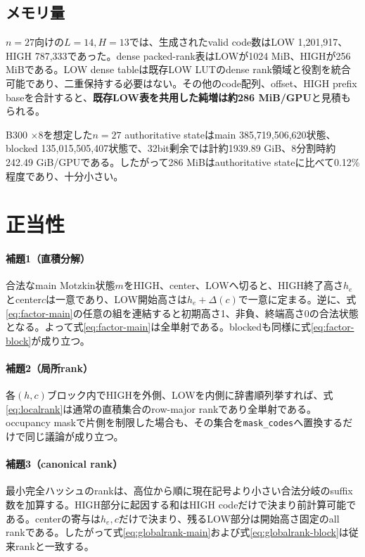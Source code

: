\documentclass[a4paper,10pt,twocolumn]{ltjsarticle}
\newcommand{\code}[1]{\texttt{#1}}
\begin{document}
\subsection{メモリ量}
$n=27$向けの$L=14,H=13$では、生成されたvalid code数はLOW 1,201,917、HIGH 787,333であった。dense packed-rank表はLOWが1024 MiB、HIGHが256 MiBである。LOW dense tableは既存LOW LUTのdense rank領域と役割を統合可能であり、二重保持する必要はない。その他のcode配列、offset、HIGH prefix baseを合計すると、\textbf{既存LOW表を共用した純増は約286 MiB/GPU}と見積もられる。

B300 $\times8$を想定した$n=27$ authoritative stateはmain 385,719,506,620状態、blocked 135,015,505,407状態で、32bit剰余では計約1939.89 GiB、8分割時約242.49 GiB/GPUである。したがって286 MiBはauthoritative stateに比べて0.12\%程度であり、十分小さい。

\section{正当性}
\paragraph{補題1（直積分解）}
合法なmain Motzkin状態$m$をHIGH、center、LOWへ切ると、HIGH終了高さ$h_e$とcenter$c$は一意であり、LOW開始高さは$h_e+\Delta(c)$で一意に定まる。逆に、式\eqref{eq:factor-main}の任意の組を連結すると初期高さ1、非負、終端高さ0の合法状態となる。よって式\eqref{eq:factor-main}は全単射である。blockedも同様に式\eqref{eq:factor-block}が成り立つ。

\paragraph{補題2（局所rank）}
各$(h,c)$ブロック内でHIGHを外側、LOWを内側に辞書順列挙すれば、式\eqref{eq:localrank}は通常の直積集合のrow-major rankであり全単射である。occupancy maskで片側を制限した場合も、その集合を\code{mask\_codes}へ置換するだけで同じ議論が成り立つ。

\paragraph{補題3（canonical rank）}
最小完全ハッシュのrankは、高位から順に現在記号より小さい合法分岐のsuffix数を加算する。HIGH部分に起因する和はHIGH codeだけで決まり前計算可能である。centerの寄与は$h_e,c$だけで決まり、残るLOW部分は開始高さ固定のall rankである。したがって式\eqref{eq:globalrank-main}および式\eqref{eq:globalrank-block}は従来rankと一致する。
\end{document}

